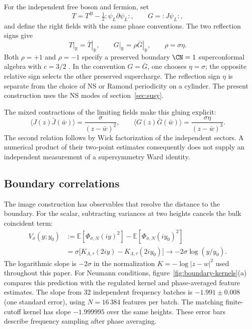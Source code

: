 For the independent free boson and fermion, set
\begin{equation}
T=T^B-\tfrac12:\psi_L\partial\psi_L:,
\qquad G=:J\psi_L:,
\label{eq:boundary-supercurrent}
\end{equation}
and define the right fields with the same phase conventions.  The two
reflection signs give
\begin{equation}
\left.T\right|_{\mathbb R}=\left.\bar T\right|_{\mathbb R},
\qquad
\left.G\right|_{\mathbb R}
=\left.\rho\bar G\right|_{\mathbb R},
\qquad \rho=\sigma\eta.
\label{eq:boundary-superconformal-gluing}
\end{equation}
Both $\rho=+1$ and $\rho=-1$ specify a preserved boundary
$\CN=1$ superconformal algebra with $c=3/2$
\cite{Gaberdiel:2008gk}.  In the convention $G=\bar G$, one chooses
$\eta=\sigma$; the opposite relative sign selects the other preserved
supercharge.  The reflection sign $\eta$ is separate from the choice of
NS or Ramond periodicity on a cylinder.  The present construction uses the
NS modes of section~\ref{sec:susy}.

The mixed contractions of the limiting fields make this gluing explicit:
\begin{equation}
\langle J(z)\bar J(\bar w)\rangle=\frac{\sigma}{(z-\bar w)^2},
\qquad
\langle G(z)\bar G(\bar w)\rangle
=\frac{\sigma\eta}{(z-\bar w)^3}.
\label{eq:boundary-mixed-current-kernels}
\end{equation}
The second relation follows by Wick factorization of the independent
sectors.  A numerical product of their two-point estimates consequently
does not supply an independent measurement of a supersymmetry Ward
identity.

\subsection{Boundary correlations}

The image construction has observables that resolve the distance to the
boundary.  For the scalar, subtracting variances at two heights cancels the
bulk coincident term:
\begin{align}
V_\sigma(y;y_0)
&:=\mathbb E[\Phi_{\sigma,N}(iy)^2]
-\mathbb E[\Phi_{\sigma,N}(iy_0)^2]\nonumber\\
&=\sigma\bigl[K_{\Lambda,\tau}(2iy)
-K_{\Lambda,\tau}(2iy_0)\bigr]
\longrightarrow -2\sigma\log(y/y_0).
\label{eq:boundary-height-statistic}
\end{align}
The logarithmic slope is $-2\sigma$ in the normalization
$K=-\log|z-w|^2$ used throughout this paper.  For Neumann conditions,
figure~\ref{fig:boundary-kernels}(a) compares this prediction with the
regulated kernel and phase-averaged feature estimates.  The slope from 32
independent frequency batches is $-1.991\pm0.008$ (one standard error),
using $N=16\,384$ features per batch.  The matching finite-cutoff kernel has
slope $-1.999995$ over the same heights.  These error bars describe frequency
sampling after phase averaging.

